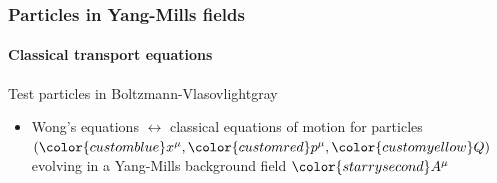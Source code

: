 \documentclass[aspectratio=169,11pt,usenames,dvipsnames]{beamer}
\begin{document}
\begin{frame}
    \frametitle{Particles in Yang-Mills fields}
    \framesubtitle{Classical transport equations}
   \begin{center}
    \begin{custombox2}{Test particles in Boltzmann-Vlasov}{lightgray}
        \small
        \begin{varwidth}{0.68\textwidth}
        \begin{itemize}\itemsep0em 
            \item {\color{palteal}Wong's equations} $\leftrightarrow$ classical equations of motion for particles\\
            $({\color{customblue}x^\mu},{\color{customred}p^\mu},{\color{customyellow}Q})$ evolving in a Yang-Mills background field ${\color{starrysecond}A^\mu}$
        \end{itemize}
        \end{varwidth}
    \end{custombox2}


\end{center}
\end{frame}
\end{document}
